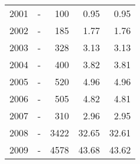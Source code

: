 \begin{longtable}{lXrrr}
        2001 & \multicolumn{1}{X}{-} & %
          \num{100} &
          \num[round-mode=places,round-precision=2]{0,95} &
          \num[round-mode=places,round-precision=2]{0,95} \\

        2002 & \multicolumn{1}{X}{-} & %
          \num{185} &
          \num[round-mode=places,round-precision=2]{1,77} &
          \num[round-mode=places,round-precision=2]{1,76} \\

        2003 & \multicolumn{1}{X}{-} & %
          \num{328} &
          \num[round-mode=places,round-precision=2]{3,13} &
          \num[round-mode=places,round-precision=2]{3,13} \\

        2004 & \multicolumn{1}{X}{-} & %
          \num{400} &
          \num[round-mode=places,round-precision=2]{3,82} &
          \num[round-mode=places,round-precision=2]{3,81} \\

        2005 & \multicolumn{1}{X}{-} & %
          \num{520} &
          \num[round-mode=places,round-precision=2]{4,96} &
          \num[round-mode=places,round-precision=2]{4,96} \\

        2006 & \multicolumn{1}{X}{-} & %
          \num{505} &
          \num[round-mode=places,round-precision=2]{4,82} &
          \num[round-mode=places,round-precision=2]{4,81} \\

        2007 & \multicolumn{1}{X}{-} & %
          \num{310} &
          \num[round-mode=places,round-precision=2]{2,96} &
          \num[round-mode=places,round-precision=2]{2,95} \\

        2008 & \multicolumn{1}{X}{-} & %
          \num{3422} &
          \num[round-mode=places,round-precision=2]{32,65} &
          \num[round-mode=places,round-precision=2]{32,61} \\

        2009 & \multicolumn{1}{X}{-} & %
          \num{4578} &
          \num[round-mode=places,round-precision=2]{43,68} &
          \num[round-mode=places,round-precision=2]{43,62} \\


\end{longtable}
